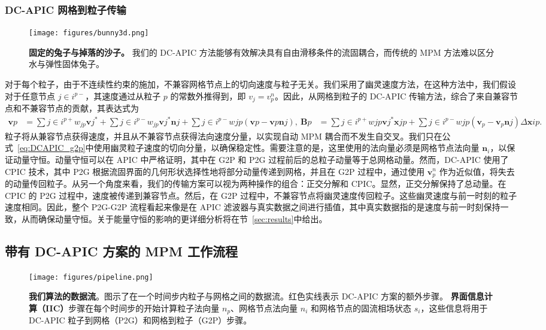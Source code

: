 \subsubsection{DC-APIC 网格到粒子传输} \label{sec:DC-APIC_g2p}

\begin{figure*} \centering \texttt{[image: figures/bunny3d.png]} \caption{\textbf{固定的兔子与掉落的沙子。} 我们的 DC-APIC 方法能够有效解决具有自由滑移条件的流固耦合，而传统的 MPM 方法难以区分水与弹性固体兔子。} \label{fig:bunny3d} \end{figure*}

对于每个粒子，由于不连续性约束的施加，不兼容网格节点上的切向速度与粒子无关。我们采用了幽灵速度方法，在这种方法中，我们假设对于任意节点 $j\in i^{p-}$，其速度通过从粒子 $p$ 的常数外推得到，即 $v_j=v_p^n$。因此，从网格到粒子的 DC-APIC 传输方法，综合了来自兼容节点和不兼容节点的贡献，其表达式为 \begin{equation} \label{eq:DCAPIC_g2p} \begin{aligned} \mathbf{v}p &=\sum{j\in i^{p+}}w_{jp}\mathbf{v}j^* + \sum{j\in i^{p-}}w_{jp}\mathbf{v}j^*\mathbf{n}j + \sum{j\in i^{p-}}w{jp}(\mathbf{v}p-\mathbf{v}p\mathbf{n}j), \ \mathbf{B}p &= \sum{j\in i^{p+}}w{jp}\mathbf{v}j^*\mathbf{x}{jp} + \sum{j\in i^{p-}}w{jp}(\mathbf{v}_p-\mathbf{v}_p\mathbf{n}j)\Delta\mathbf{x}{ip}. \end{aligned} \end{equation} 粒子将从兼容节点获得速度，并且从不兼容节点获得法向速度分量，以实现自动 MPM 耦合而不发生自交叉。我们只在公式~\eqref{eq:DCAPIC_g2p}中使用幽灵粒子速度的切向分量，以确保稳定性。需要注意的是，这里使用的法向量必须是网格节点法向量 $\mathbf{n}_i$，以保证动量守恒。动量守恒可以在 APIC 中严格证明，其中在 G2P 和 P2G 过程前后的总粒子动量等于总网格动量。然而，DC-APIC 使用了 CPIC 技术，其中 P2G 根据流固界面的几何形状选择性地将部分动量传递到网格，并且在 G2P 过程中，通过使用 $\mathbf{v}_p^n$ 作为近似值，将失去的动量传回粒子。从另一个角度来看，我们的传输方案可以视为两种操作的组合：正交分解和 CPIC。显然，正交分解保持了总动量。在 CPIC 的 P2G 过程中，速度被传递到兼容节点。然后，在 G2P 过程中，不兼容节点将幽灵速度传回粒子。这些幽灵速度与前一时刻的粒子速度相同。因此，整个 P2G-G2P 流程看起来像是在 APIC 滤波器与真实数据之间进行插值，其中真实数据指的是速度与前一时刻保持一致，从而确保动量守恒。关于能量守恒的影响的更详细分析将在节~\ref{sec:results}中给出。

\subsection{带有 DC-APIC 方案的 MPM 工作流程}
\begin{figure*}[htbp]
\centering
\texttt{[image: figures/pipeline.png]}
\caption{\textbf{我们算法的数据流}。图示了在一个时间步内粒子与网格之间的数据流。红色实线表示 DC-APIC 方案的额外步骤。 \textbf{界面信息计算（IIC）}步骤在每个时间步的开始计算粒子法向量 $n_p$、网格节点法向量 $n_i$ 和网格节点的固流相场状态 $s_i$，这些信息将用于 DC-APIC 粒子到网格（P2G）和网格到粒子（G2P）步骤。} 
\label{fig:pipeline}
\end{figure*}

